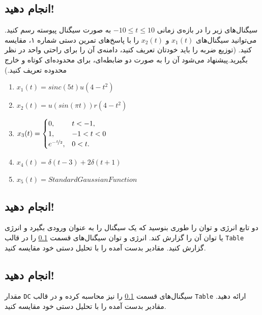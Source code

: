 \documentclass{utsignal}
\begin{document}
	\subsection{انجام دهید!} \label{ssec:signals}
	سیگنال‌های زیر را در بازه‌ی زمانی $-10 \le t \le 10$ به صورت سیگنال پیوسته رسم کنید. می‌توانید سیگنال‌های $x_1(t)$ و $x_2(t)$ را با پاسخ‌های تمرین دستی شماره ۱، مقایسه کنید. (توزیع ضربه را باید خودتان تعریف کنید، دامنه‌ی آن را برای راحتی واحد در نظر بگیرید.پیشنهاد می‌شود آن را به صورت دو ضابطه‌ای، برای محدوده‌ای کوتاه و خارج محدوده تعریف کنید.)
	\begin{latin}
		\begin{flushleft}
			\begin{enumerate}
				\item $x_1(t) = sinc(5t) u(4-t^2)$
				\item $x_2(t) = u(sin(\pi t)) r(4-t^2)$
				\item $x_3(t) = \begin{cases}
									0, & t < -1,\\
									1, & -1 < t < 0\\
									e^{-\nicefrac{t}{2}}, & 0 < t.
								\end{cases}$
				\item $x_4(t) = \delta(t-3) + 2\delta(t+1)$
				\item $x_5(t) = Standard Gaussian Function$
			\end{enumerate}
		\end{flushleft}
	\end{latin}

	\subsection{انجام دهید!}
	دو تابع انرژی و توان را طوری بنوسید که یک سیگنال را به عنوان ورودی بگیرد و انرژی یا توان آن را گزارش کند. انرژی و توان سیگنال‌های قسمت \ref{ssec:signals} را در قالب \lstinline{Table} گزارش کنید. مقادیر بدست آمده را با تحلیل دستی خود مقایسه کنید.
	\subsection{انجام دهید!}
	مقدار \lstinline{DC} سیگنال‌های قسمت \ref{ssec:signals} را نیز محاسبه کرده و در قالب \lstinline{Table}  ارائه دهید. مقادیر بدست آمده را با تحلیل دستی خود مقایسه کنید.
\end{document}
